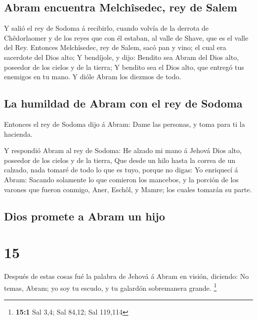 \hypertarget{abram-encuentra-melchuxeesedec-rey-de-salem}{%
\subsection{Abram encuentra Melchîsedec, rey de
Salem}\label{abram-encuentra-melchuxeesedec-rey-de-salem}}

 Y salió el rey de Sodoma á recibirlo, cuando volvía de la
derrota de Chêdorlaomer y de los reyes que con él estaban, al valle de
Shave, que es el valle del Rey.  Entonces Melchîsedec, rey
de Salem, sacó pan y vino; el cual era sacerdote del Dios alto;
 Y bendíjole, y dijo: Bendito sea Abram del Dios alto,
poseedor de los cielos y de la tierra;  Y bendito sea el
Dios alto, que entregó tus enemigos en tu mano. Y dióle Abram los
diezmos de todo.

\hypertarget{la-humildad-de-abram-con-el-rey-de-sodoma}{%
\subsection{La humildad de Abram con el rey de
Sodoma}\label{la-humildad-de-abram-con-el-rey-de-sodoma}}

 Entonces el rey de Sodoma dijo á Abram: Dame las personas,
y toma para ti la hacienda.

 Y respondió Abram al rey de Sodoma: He alzado mi mano á
Jehová Dios alto, poseedor de los cielos y de la tierra, 
Que desde un hilo hasta la correa de un calzado, nada tomaré de todo lo
que es tuyo, porque no digas: Yo enriquecí á Abram: 
Sacando solamente lo que comieron los mancebos, y la porción de los
varones que fueron conmigo, Aner, Eschôl, y Mamre; los cuales tomarán su
parte.

\hypertarget{dios-promete-a-abram-un-hijo}{%
\subsection{Dios promete a Abram un
hijo}\label{dios-promete-a-abram-un-hijo}}

\hypertarget{section-14}{%
\section{15}\label{section-14}}

 Después de estas cosas fué la palabra de Jehová á Abram en
visión, diciendo: No temas, Abram; yo soy tu escudo, y tu galardón
sobremanera grande. \footnote{\textbf{15:1} Sal 3,4; Sal 84,12; Sal
  119,114}

